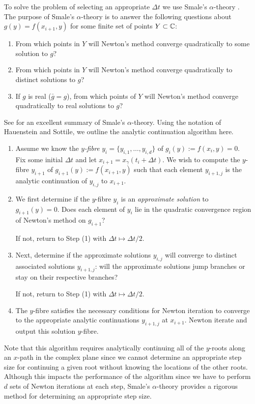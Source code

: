 To solve the problem of selecting an appropriate $\Delta t$ we use
Smale's $\alpha$-theory \cite{Smale85}. The purpose of Smale's
$\alpha$-theory is to answer the following questions about $g(y) =
f(x_{i+1},y)$ for some finite set of points $Y \subset \operatorname{\mathbb{C}}$:
\begin{enumerate}
  \item From which points in $Y$ will Newton's method converge
    quadratically to some solution to $g$?
  \item From which points in $Y$ will Newton's method converge
    quadratically to distinct solutions to $g$?
  \item If $g$ is real ($\bar{g} = g$), from which points of $Y$ will
    Newton's method converge quadratically to real solutions to $g$?
\end{enumerate}
See \cite{HauensteinSottile10} for an excellent summary of Smale's
$\alpha$-theory. Using the notation of Hauenstein and Sottile, we
outline the analytic continuation algorithm here.
\begin{enumerate}
  \item Assume we know the {\it $y$-fibre} $y_i =
    \{y_{i,1},\ldots,y_{i,d}\}$ of $g_i(y) := f(x_i,y)=0$. Fix some
    initial $\Delta t$ and let $x_{i+1} = x_\gamma(t_i + \Delta t)$. We
    wish to compute the $y$-fibre $y_{i+1}$ of $g_{i+1}(y) :=
    f(x_{i+1},y)$ such that each element $y_{i+1,j}$ is the analytic
    continuation of $y_{i,j}$ to $x_{i+1}$.
  \item We first determine if the $y$-fibre $y_i$ is an {\it approximate
    solution} to $g_{i+1}(y) = 0$. Does each element of $y_i$ lie in the
    quadratic convergence region of Newton's method on $g_{i+1}$?

    If not, return to Step (1) with $\Delta t \mapsto \Delta t / 2$.
  \item Next, determine if the approximate solutions $y_{i,j}$ will
    converge to distinct associated solutions $y_{i+1,j}$: will the
    approximate solutions jump branches or stay on their respective
    branches?

    If not, return to Step (1) with $\Delta t \mapsto \Delta t / 2$.
  \item The $y$-fibre satisfies the necessary conditions for Newton
    iteration to converge to the appropriate analytic continuations
    $y_{i+1,j}$ at $x_{i+1}$. Newton iterate and output this solution
    $y$-fibre.
\end{enumerate}

Note that this algorithm requires analytically continuing all of the
$y$-roots along an $x$-path in the complex plane since we cannot
determine an appropriate step size for continuing a given root without
knowing the locations of the other roots. Although this impacts the
performance of the algorithm since we have to perform $d$ sets of Newton
iterations at each step, Smale's $\alpha$-theory provides a rigorous
method for determining an appropriate step size.


